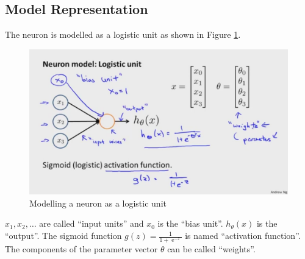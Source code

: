 \documentclass[a4paper,twoside,10pt]{article}
\begin{document}
\subsection{Model Representation}
The neuron is modelled as a logistic unit as shown in Figure \ref{fig:logisticunit}.
\begin{figure}[htbp]
  \begin{center}
    \includegraphics[width=.6\textwidth]{logisticunit}
    \caption{Modelling a neuron as a logistic unit\citep{andrewng}\label{fig:logisticunit}}
  \end{center}
\end{figure}
$x_1, x_2, \ldots$ are called ``input units'' and $x_0$ is the ``bias unit''.
$h_\theta(x)$ is the ``output''.
The sigmoid function $g(z)=\frac{1}{1+\operatorname{e}^{-z}}$ is named ``activation function''.
The components of the parameter vector $\theta$ can be called ``weights''.
\end{document}
